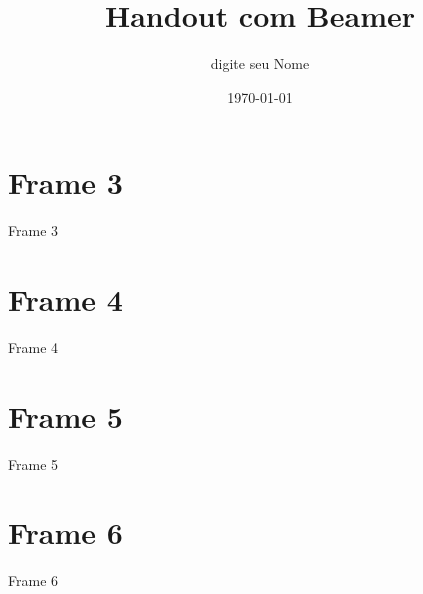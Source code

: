 \documentclass[aspectratio=169]{beamer}
\title{Handout com Beamer}
\author[digite seu Nome]{digite seu Nome}
\institute{nome do instituto}
\date{\today}
\begin{document}
\begin{frame}
\titlepage
\end{frame}

\begin{frame}
\tableofcontents	%
\end{frame}

\section{Frame 3}
\begin{frame}
\huge Frame 3
\end{frame}

\section{Frame 4}
\begin{frame}
\huge Frame 4
\end{frame}

\section{Frame 5}
\begin{frame}
\huge Frame 5
\end{frame}

\section{Frame 6}
\begin{frame}
\huge Frame 6
\end{frame}
\end{document}

